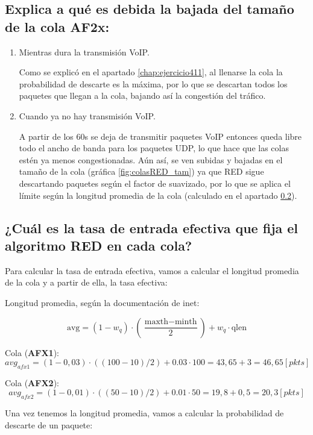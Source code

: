 \subsection{Explica a qué es debida la bajada del tamaño de la cola AF2x:}
\begin{enumerate}
    \item Mientras dura la transmisión VoIP.
    
    Como se explicó en el apartado \ref{chap:ejercicio411}, al llenarse la cola la probabilidad de descarte es la máxima, por lo que se descartan
    todos los paquetes que llegan a la cola, bajando así la congestión del tráfico.      

    \item Cuando ya no hay transmisión VoIP.
    
    A partir de los 60s se deja de transmitir paquetes VoIP entonces queda libre todo el ancho de banda para los paquetes UDP, 
    lo que hace que las colas estén ya menos congestionadas. Aún así, se ven subidas y bajadas en el tamaño de la cola (gráfica \ref{fig:colasRED_tam}) 
    ya que RED sigue descartando paquetes según el factor de suavizado, por lo que se aplica el límite según la longitud promedia de la cola (calculado en 
    el apartado \ref{text:calculos}).
    


\end{enumerate}

\subsection{¿Cuál es la tasa de entrada efectiva que fija el algoritmo RED en cada cola?} \label{text:calculos}

Para calcular la tasa de entrada efectiva, vamos a calcular el longitud promedia de la cola y a partir de ella, la tasa efectiva:

Longitud promedia, según la documentación de inet:

\[
\text{avg} = (1 - w_q) \cdot \left(\frac{\text{maxth} - \text{minth}}{2}\right) + w_q \cdot \text{qlen}
\]

Cola (\textbf{AFX1}):
\[
 avg_{afx1} = (1-0,03) \cdot \left((100-10)/2\right) + 0.03 \cdot 100 = 43,65 + 3 = 46,65 [pkts]
\]

Cola (\textbf{AFX2}):
\[
 avg_{afx2} = (1-0,01) \cdot \left((50-10)/2\right) + 0.01 \cdot 50 = 19,8 + 0,5 = 20,3 [pkts]
\]

Una vez tenemos la longitud promedia, vamos a calcular la probabilidad de descarte de un paquete:

